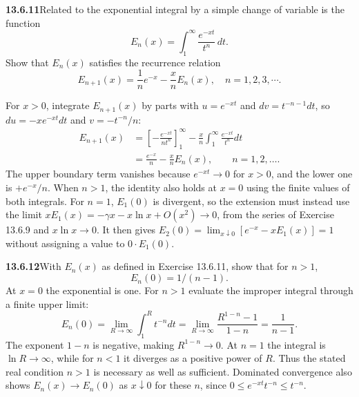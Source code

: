 \par\bigskip
\noindent\textbf{13.6.11}\quad Related to the exponential integral by a
simple change of variable is the function
\[
E_{n}(x)=\int_{1}^{\infty}\frac{e^{-xt}}{t^{n}}\,dt.
\]
Show that $E_{n}(x)$ satisfies the recurrence relation
\[
E_{n+1}(x)=\frac{1}{n}e^{-x}-\frac{x}{n}E_{n}(x),\quad n=1,2,3,\cdots.
\]
\par\smallskip
{}
\solution
For $x>0$, integrate $E_{n+1}(x)$ by parts with
$u=e^{-xt}$ and $dv=t^{-n-1}dt$, so
$du=-xe^{-xt}dt$ and $v=-t^{-n}/n$:
\begin{align*}
E_{n+1}(x)
&=\left[-\frac{e^{-xt}}{nt^n}\right]_1^\infty
-\frac xn\int_1^\infty\frac{e^{-xt}}{t^n}dt\\
&=\boxed{\frac{e^{-x}}n-\frac xnE_n(x)},
\qquad n=1,2,\ldots.
\end{align*}
The upper boundary term vanishes because $e^{-xt}\to0$ for
$x>0$, and the lower one is $+e^{-x}/n$.  When $n>1$, the
identity also holds at $x=0$ using the finite values of both
integrals.  For $n=1$, $E_1(0)$ is divergent, so the extension
must instead use the limit $xE_1(x)=-\gamma x-x\ln x+O(x^2)\to0$,
from the series of Exercise 13.6.9 and $x\ln x\to0$.  It then
gives $E_2(0)=\lim_{x\downarrow0}[e^{-x}-xE_1(x)]=1$ without
assigning a value to $0\cdot E_1(0)$.


\par\bigskip
\noindent\textbf{13.6.12}\quad With $E_{n}(x)$ as defined in Exercise
13.6.11, show that for $n>1$,
\[
E_{n}(0)=1/(n-1).
\]
\solution
At $x=0$ the exponential is one.  For $n>1$ evaluate the
improper integral through a finite upper limit:
\[
E_n(0)=\lim_{R\to\infty}\int_1^R t^{-n}dt
=\lim_{R\to\infty}\frac{R^{1-n}-1}{1-n}
=\boxed{\frac1{n-1}}.
\]
The exponent $1-n$ is negative, making $R^{1-n}\to0$.
At $n=1$ the integral is $\ln R\to\infty$, while for $n<1$
it diverges as a positive power of $R$.  Thus the stated real
condition $n>1$ is necessary as well as sufficient.  Dominated
convergence also shows $E_n(x)\to E_n(0)$ as $x\downarrow0$
for these $n$, since $0\le e^{-xt}t^{-n}\le t^{-n}$.


